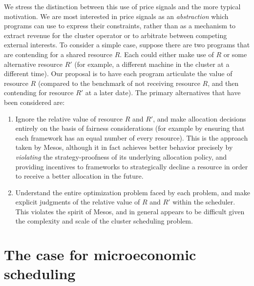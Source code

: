 \documentclass{acm_proc_article-sp}
\begin{document}
We stress the distinction between this use of price signals and the more typical
motivation. We are most interested in price signals as an \emph{abstraction} which
programs can use to express their constraints, rather than as a mechanism to
extract revenue for the cluster operator or to arbitrate between competing
external interests. To consider a simple case, suppose there are two programs
that are contending for a shared resource $R$. Each could either make use of $R$ or
some alternative resource $R'$ (for example, a different machine in the cluster at
a different time). Our proposal is to have each program articulate the value of
resource $R$ (compared to the benchmark of not receiving resource $R$, and then
contending for resource $R'$ at a later date). The primary alternatives that have
been considered are:
\begin{enumerate}
  \item Ignore the relative value of resource $R$ and $R'$, and make allocation
    decisions entirely on the basis of fairness considerations (for example by
    ensuring that each framework has an equal number of every resource). This is
    the approach taken by Mesos, although it in fact achieves better behavior
    precisely by \emph{violating} the strategy-proofness of its underlying allocation
    policy, and providing incentives to frameworks to strategically decline a
    resource in order to receive a better allocation in the future.
  \item Understand the entire optimization problem faced by each problem, and
    make explicit judgments of the relative value of $R$ and $R'$ within the
    scheduler. This violates the spirit of Mesos, and in general appears to be
    difficult given the complexity and scale of the cluster scheduling problem.
\end{enumerate}


\section{The case for microeconomic scheduling}
\label{sec:case}
\end{document}
